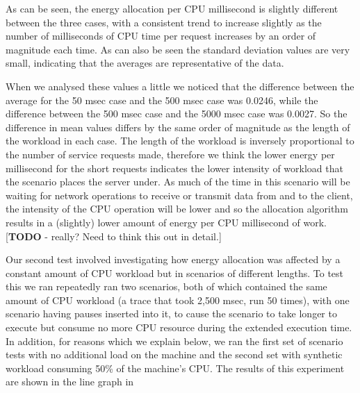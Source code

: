 As can be seen, the energy allocation per CPU millisecond is slightly different between the three cases, with a consistent trend to increase slightly as the number of milliseconds of CPU time per request increases by an order of magnitude each time.  As can also be seen the standard deviation values are very small, indicating that the averages are representative of the data.

When we analysed these values a little we noticed that the difference between the average for the 50 msec case and the 500 msec case was 0.0246, while the difference between the 500 msec case and the 5000 msec case was 0.0027.  So the difference in mean values differs by the same order of magnitude as the length of the workload in each case.  The length of the workload is inversely proportional to the number of service requests made, therefore we think the lower energy per millisecond for the short requests indicates the lower intensity of workload that the scenario places the server under.  As much of the time in this scenario will be waiting for network operations to receive or transmit data from and to the client, the intensity of the CPU operation will be lower and so the allocation algorithm results in a (slightly) lower amount of energy per CPU millisecond of work. [\textbf{TODO} - really?  Need to think this out in detail.]

Our second test involved investigating how energy allocation was affected by a constant amount of CPU workload but in scenarios of different lengths.  To test this we ran repeatedly ran two scenarios, both of which contained the same amount of CPU workload (a trace that took 2,500 msec, run 50 times), with one scenario having pauses inserted into it, to cause the scenario to take longer to execute but consume no more CPU resource during the extended execution time.  In addition, for reasons which we explain below, we ran the first set of scenario tests with no additional load on the machine and the second set with synthetic workload consuming 50\% of the machine's CPU.  The results of this experiment are shown in the line graph in 

